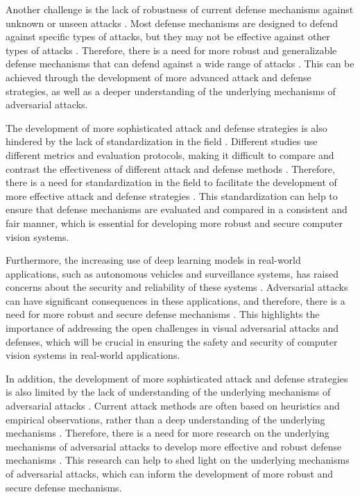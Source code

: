 \documentclass[11pt]{article}
\begin{document}
Another challenge is the lack of robustness of current defense mechanisms against unknown or unseen attacks \cite{ref225}. Most defense mechanisms are designed to defend against specific types of attacks, but they may not be effective against other types of attacks \cite{ref196}. Therefore, there is a need for more robust and generalizable defense mechanisms that can defend against a wide range of attacks \cite{ref109}. This can be achieved through the development of more advanced attack and defense strategies, as well as a deeper understanding of the underlying mechanisms of adversarial attacks.

The development of more sophisticated attack and defense strategies is also hindered by the lack of standardization in the field \cite{ref176}. Different studies use different metrics and evaluation protocols, making it difficult to compare and contrast the effectiveness of different attack and defense methods \cite{ref145}. Therefore, there is a need for standardization in the field to facilitate the development of more effective attack and defense strategies \cite{ref226}. This standardization can help to ensure that defense mechanisms are evaluated and compared in a consistent and fair manner, which is essential for developing more robust and secure computer vision systems.

Furthermore, the increasing use of deep learning models in real-world applications, such as autonomous vehicles and surveillance systems, has raised concerns about the security and reliability of these systems \cite{ref63}. Adversarial attacks can have significant consequences in these applications, and therefore, there is a need for more robust and secure defense mechanisms \cite{ref8}. This highlights the importance of addressing the open challenges in visual adversarial attacks and defenses, which will be crucial in ensuring the safety and security of computer vision systems in real-world applications.

In addition, the development of more sophisticated attack and defense strategies is also limited by the lack of understanding of the underlying mechanisms of adversarial attacks \cite{ref227}. Current attack methods are often based on heuristics and empirical observations, rather than a deep understanding of the underlying mechanisms \cite{ref105}. Therefore, there is a need for more research on the underlying mechanisms of adversarial attacks to develop more effective and robust defense mechanisms \cite{ref228}. This research can help to shed light on the underlying mechanisms of adversarial attacks, which can inform the development of more robust and secure defense mechanisms.
\end{document}
